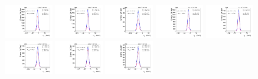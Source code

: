 \begin{figure}[htb]
\includegraphics[width=0.19\textwidth]{plots/Appendix_Recoil_Fits/WmmMC_PF_5TeV_2G/pfu1fit_8.pdf}
\includegraphics[width=0.19\textwidth]{plots/Appendix_Recoil_Fits/WmmMC_PF_5TeV_2G/pfu1fit_9.pdf}
\includegraphics[width=0.19\textwidth]{plots/Appendix_Recoil_Fits/WmmMC_PF_5TeV_2G/pfu1fit_19.pdf}
\includegraphics[width=0.19\textwidth]{plots/Appendix_Recoil_Fits/WmmMC_PF_5TeV_2G/pfu1fit_11.pdf}
\includegraphics[width=0.19\textwidth]{plots/Appendix_Recoil_Fits/WmmMC_PF_5TeV_2G/pfu1fit_12.pdf}
\includegraphics[width=0.19\textwidth]{plots/Appendix_Recoil_Fits/WmmMC_PF_5TeV_2G/pfu1fit_13.pdf}
\includegraphics[width=0.19\textwidth]{plots/Appendix_Recoil_Fits/WmmMC_PF_5TeV_2G/pfu1fit_14.pdf}
\includegraphics[width=0.19\textwidth]{plots/Appendix_Recoil_Fits/WmmMC_PF_5TeV_2G/pfu1fit_15.pdf}

\end{figure}
